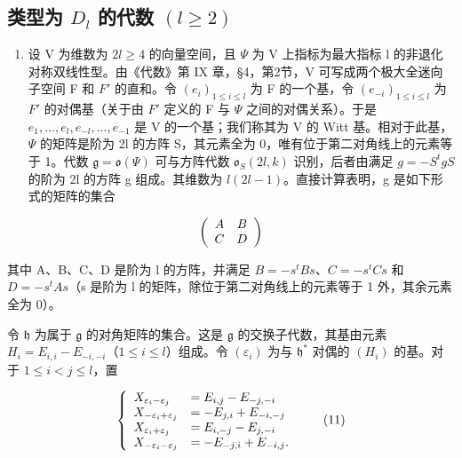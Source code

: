 \subsection{\texorpdfstring{类型为 \(D_{l}\) 的代数 \((l\geq 2)\)}{类型为 D\_\{l\} 的代数 (l\textbackslash geq 2)}}

\begin{enumerate}
\def\labelenumi{(\Roman{enumi})}
\tightlist
\item
  设 V 为维数为 \(2l \geq 4\) 的向量空间，且 \(\varPsi\) 为 V 上指标为最大指标 l 的非退化对称双线性型。由《代数》第 IX 章，§4，第2节，V 可写成两个极大全迷向子空间 F 和 \(F'\) 的直和。令 \((e_i)_{1 \leq i \leq l}\) 为 F 的一个基，令 \((e_{-i})_{1 \leq i \leq l}\) 为 \(F'\) 的对偶基（关于由 \(F'\) 定义的 F 与 \(\varPsi\) 之间的对偶关系）。于是 \(e_1, \ldots, e_l, e_{-l}, \ldots, e_{-1}\) 是 V 的一个基；我们称其为 V 的 Witt 基。相对于此基，\(\varPsi\) 的矩阵是阶为 2l 的方阵 S，其元素全为 0，唯有位于第二对角线上的元素等于 1。代数 \(\mathfrak{g} = \mathfrak{o}(\varPsi)\) 可与方阵代数 \(\mathfrak{o}_S(2l, k)\) 识别，后者由满足 \(g = -S^t g S\) 的阶为 2l 的方阵 g 组成。其维数为 \(l(2l - 1)\)。直接计算表明，g 是如下形式的矩阵的集合
\end{enumerate}

\[
\left( \begin{array}{c c} A & B \\ C & D \end{array} \right)
\]

其中 A、B、C、D 是阶为 l 的方阵，并满足 \(B = -s^{t}Bs\)、\(C = -s^{t}Cs\) 和 \(D = -s^{t}As\)（s 是阶为 l 的矩阵，除位于第二对角线上的元素等于 1 外，其余元素全为 0）。

令 \(\mathfrak{h}\) 为属于 \(\mathfrak{g}\) 的对角矩阵的集合。这是 \(\mathfrak{g}\) 的交换子代数，其基由元素 \(H_{i} = E_{i,i} - E_{-i,-i}\)（\(1 \leq i \leq l\)）组成。令 \((\varepsilon_{i})\) 为与 \(\mathfrak{h}^{*}\) 对偶的 \((H_{i})\) 的基。对于 \(1 \leq i < j \leq l\)，置

\[
\left\{ \begin{array}{l l} X _ {\varepsilon_ {i} - \varepsilon_ {j}} & = E _ {i, j} - E _ {- j, - i} \\ X _ {- \varepsilon_ {i} + \varepsilon_ {j}} & = - E _ {j, i} + E _ {- i, - j} \\ X _ {\varepsilon_ {i} + \varepsilon_ {j}} & = E _ {i, - j} - E _ {j, - i} \\ X _ {- \varepsilon_ {i} - \varepsilon_ {j}} & = - E _ {- j, i} + E _ {- i, j}. \end{array} \right.\tag{11}
\]

